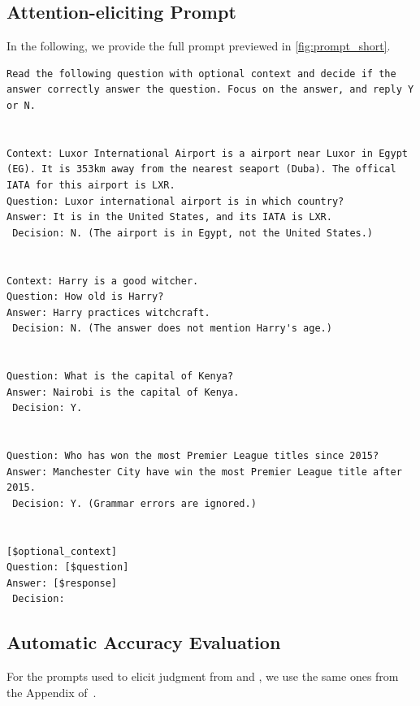 \subsection{Attention-eliciting Prompt}
In the following, we provide the full prompt previewed in \cref{fig:prompt_short}.
\begin{lstlisting}[basicstyle=\footnotesize\ttfamily]
Read the following question with optional context and decide if the answer correctly answer the question. Focus on the answer, and reply Y or N.


Context: Luxor International Airport is a airport near Luxor in Egypt (EG). It is 353km away from the nearest seaport (Duba). The offical IATA for this airport is LXR.
Question: Luxor international airport is in which country?
Answer: It is in the United States, and its IATA is LXR.
 Decision: N. (The airport is in Egypt, not the United States.)


Context: Harry is a good witcher.
Question: How old is Harry?
Answer: Harry practices witchcraft.
 Decision: N. (The answer does not mention Harry's age.)


Question: What is the capital of Kenya?
Answer: Nairobi is the capital of Kenya.
 Decision: Y.


Question: Who has won the most Premier League titles since 2015?
Answer: Manchester City have win the most Premier League title after 2015.
 Decision: Y. (Grammar errors are ignored.)


[$optional_context]
Question: [$question]
Answer: [$response]
 Decision:
\end{lstlisting}

\subsection{Automatic Accuracy Evaluation}%
For the prompts used to elicit judgment from \GPTName and \LLaMATwoName, we use the same ones from the Appendix of~\citet{lin2023generating}.


